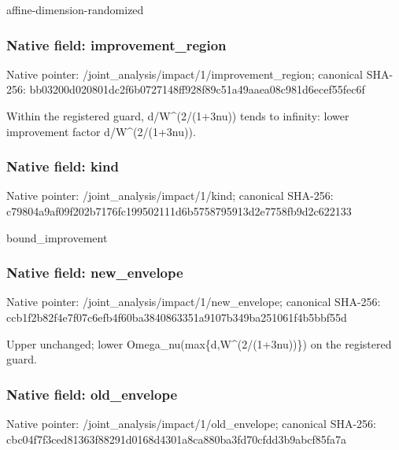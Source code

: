 \documentclass[10pt,a4paper]{article}
\begin{document}
\begingroup\raggedright\sloppy affine-dimension-randomized\par\endgroup

\subsubsection{Native field: improvement\_\allowbreak{}region}
Native pointer: /joint\_\allowbreak{}analysis/impact/1/improvement\_\allowbreak{}region; canonical SHA-256: bb03200d020801dc2f6b0727148ff928f89c51a49aaea08c981d6ecef55fec6f

\begingroup\raggedright\sloppy Within the registered guard,\allowbreak{} d/\allowbreak{}W\textasciicircum{}(2/\allowbreak{}(1+3nu)) tends to infinity:\allowbreak{} lower improvement factor d/\allowbreak{}W\textasciicircum{}(2/\allowbreak{}(1+3nu)).\par\endgroup

\subsubsection{Native field: kind}
Native pointer: /joint\_\allowbreak{}analysis/impact/1/kind; canonical SHA-256: c79804a9af09f202b7176fc199502111d6b5758795913d2e7758fb9d2c622133

\begingroup\raggedright\sloppy bound\_\allowbreak{}improvement\par\endgroup

\subsubsection{Native field: new\_\allowbreak{}envelope}
Native pointer: /joint\_\allowbreak{}analysis/impact/1/new\_\allowbreak{}envelope; canonical SHA-256: ccb1f2b82f4e7f07c6efb4f60ba3840863351a9107b349ba251061f4b5bbf55d

\begingroup\raggedright\sloppy Upper unchanged;\allowbreak{} lower Omega\_\allowbreak{}nu(max\{d,\allowbreak{}W\textasciicircum{}(2/\allowbreak{}(1+3nu))\}) on the registered guard.\par\endgroup

\subsubsection{Native field: old\_\allowbreak{}envelope}
Native pointer: /joint\_\allowbreak{}analysis/impact/1/old\_\allowbreak{}envelope; canonical SHA-256: cbc04f7f3ced81363f88291d0168d4301a8ca880ba3fd70cfdd3b9abcf85fa7a
\end{document}

